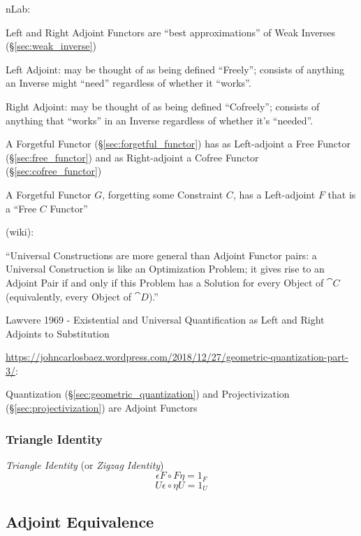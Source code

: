 nLab:

Left and Right Adjoint Functors are ``best approximations'' of Weak
Inverses (\S\ref{sec:weak_inverse})

Left Adjoint: may be thought of as being defined ``Freely''; consists
of anything an Inverse might ``need'' regardless of whether it
``works''.

Right Adjoint: may be thought of as being defined ``Cofreely'';
consists of anything that ``works'' in an Inverse regardless of
whether it's ``needed''.

A Forgetful Functor (\S\ref{sec:forgetful_functor}) has as
Left-adjoint a Free Functor (\S\ref{sec:free_functor}) and as
Right-adjoint a Cofree Functor (\S\ref{sec:cofree_functor})

A Forgetful Functor $G$, forgetting some Constraint $C$, has a
Left-adjoint $F$ that is a ``Free $C$ Functor'' %

(wiki):

``Universal Constructions are more general than Adjoint Functor pairs: a
Universal Construction is like an Optimization Problem; it gives rise to an
Adjoint Pair if and only if this Problem has a Solution for every Object of
$\cat{C}$ (equivalently, every Object of $\cat{D}$).''

\asterism

Lawvere 1969 - Existential and Universal Quantification as Left and Right
Adjoints to Substitution

\asterism

\url{https://johncarlosbaez.wordpress.com/2018/12/27/geometric-quantization-part-3/}:

Quantization (\S\ref{sec:geometric_quantization}) and Projectivization
(\S\ref{sec:projectivization}) are Adjoint Functors



\subsubsection{Triangle Identity}\label{sec:triangle_identity}

\emph{Triangle Identity} (or \emph{Zigzag Identity})
\[
  \epsilon F \circ F \eta = 1_F
\]\[
  U \epsilon \circ \eta U = 1_U
\]



\subsection{Adjoint Equivalence}\label{sec:adjoint_equivalence}

